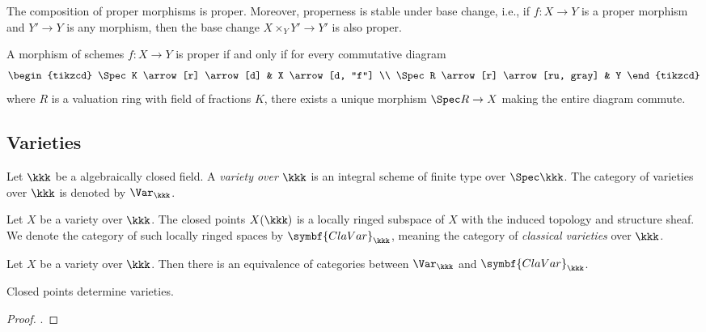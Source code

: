     \begin{proposition}\label{prop:composition_and_base_change_of_proper_morphisms}
        The composition of proper morphisms is proper.
        Moreover, properness is stable under base change, i.e., if \(f : X \to Y\) is a proper morphism and \(Y' \to Y\) is any morphism, then the base change \(X \times_Y Y' \to Y'\) is also proper.
        
    \end{proposition}

    \begin{proposition}\label{prop:valuative_criterion_of_properness}
        A morphism of schemes \(f : X \to Y\) is proper if and only if for every commutative diagram
        \[
            \begin{tikzcd}
                \Spec K \arrow[r] \arrow[d] & X \arrow[d, "f"] \\
                \Spec R \arrow[r] \arrow[ru, gray] & Y
            \end{tikzcd}
        \]
        where \(R\) is a valuation ring with field of fractions \(K\), there exists a unique morphism \(\Spec R \to X\) making the entire diagram commute.
    \end{proposition}

    
\subsection{Varieties}

    \begin{definition}\label{def:variety_over_algebraically_closed_field}
        Let \(\kkk\) be a algebraically closed field.
        A \emph{variety over \(\kkk\)} is an integral scheme of finite type over \(\Spec \kkk\).
        The category of varieties over \(\kkk\) is denoted by \(\Var_\kkk\).
    \end{definition}

    Let \(X\) be a variety over \(\kkk\).
    The closed points \(X(\kkk)\) is a locally ringed subspace of \(X\) with the induced topology and structure sheaf.
    We denote the category of such locally ringed spaces by \(\symbf{ClaVar}_\kkk\), meaning the category of \emph{classical varieties} over \(\kkk\).

    \begin{theorem}\label{prop:closed_point_determine_varieties}
        Let \(X\) be a variety over \(\kkk\).
        Then there is an equivalence of categories between \(\Var_\kkk\) and \(\symbf{ClaVar}_\kkk\).
    \end{theorem}
    \begin{slogan}
        Closed points determine varieties.
    \end{slogan}
    \begin{proof}
        .
    \end{proof}